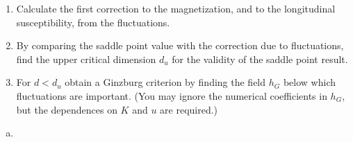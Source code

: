 \begin{problem}
\begin{enumerate}
        \item[(h)] Calculate the first correction to the magnetization, and to the longitudinal susceptibility, from the fluctuations.

        \item[(i)] By comparing the saddle point value with the correction due to fluctuations, find the upper critical dimension $d_u$ for the validity of the saddle point result.

        \item[(j)] For $d < d_u$ obtain a Ginzburg criterion by finding the field $h_G$ below which fluctuations are important. (You may ignore the numerical coefficients in $h_G$, but the dependences on $K$ and $u$ are required.)
    \end{enumerate}
\end{problem}

\begin{solution}
    \begin{enumerate}[(a)]
        \item
    \end{enumerate}
\end{solution}
